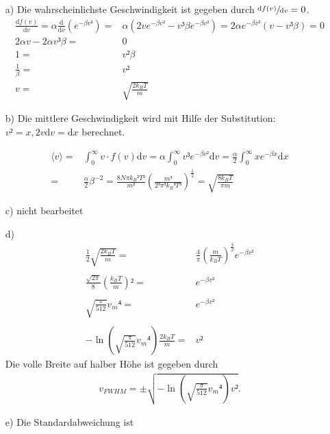 \begin{itemize}
\item[a)] Die wahrscheinlichste Geschwindigkeit ist gegeben durch $\sfrac{\text{d}f(v)}{\text{d}v}=0$.
\begin{align*}
\frac{\text{d}f(v)}{\text{d}v}=\alpha\frac{\text{d}}{\text{d}v}\left(e^{-\beta v²}\right)=&\alpha\left(2ve^{-\beta v²}-v³\beta e^{-\beta v²}\right)=2\alpha e^{-\beta v²}\left(v-v³\beta\right)=0\\
2\alpha v - 2\alpha v³ \beta =& 0\\
1 =& v²\beta\\
\frac{1}{\beta}=&v²\\
v=&\sqrt{\frac{2k_BT}{m}}
\end{align*}



\item[b)] Die mittlere Geschwindigkeit wird mit Hilfe der Substitution:$ v² = x, 2v\text{d}v = \text{d}x$ berechnet. 

\begin{align*}
\langle v\rangle=&\int_{0}^\infty v\cdot f(v)\text{d}v=\alpha \int_{0}^\infty v³e^{-\beta v²}\text{d}v=\frac{\alpha}{2} \int_{0}^\infty x e^{-\beta x}\text{d}x\\
= &\frac{\alpha}{2}\beta^{-2} = \frac{8N\pi {k_B}² T²}{m²}\left(\frac{m³}{2³\pi³{k_B}³T³}\right)^{\frac{1}{2}} = \sqrt{\frac{8k_B T}{\pi m}}
\end{align*}



\item[c)] nicht bearbeitet
\item[d)] 
\begin{align*}
 \frac{1}{2}\sqrt{\frac{2k_BT}{m}} =&\frac{4}{\pi}\left(\frac{m}{k_BT}\right)^\frac{3}{2}e^{-\beta v²} \\\\
\frac{\sqrt{2\pi}}{8}\left(\frac{k_BT}{m}\right)² =& e^{-\beta v²}\\\\
\sqrt{\frac{\pi}{512}}{v_m}⁴ =& e^{-\beta v²}\\\\
-\ln{\left(\sqrt{\frac{\pi}{512}}{v_m}⁴\right)}\frac{2k_BT}{m}=&v²
\end{align*}
Die volle Breite auf halber Höhe ist gegeben durch
\begin{align*}
v_{FWHM}=\pm\sqrt{-\ln{\left(\sqrt{\frac{\pi}{512}}{v_m}⁴\right)}v²}.
\end{align*}
\item[e)] Die Standardabweichung ist


\end{itemize}
